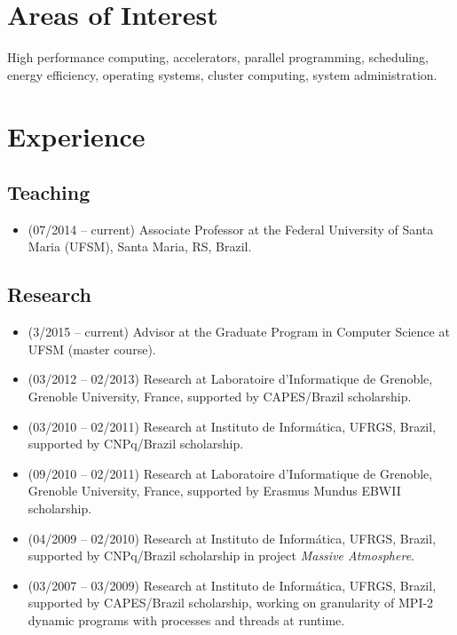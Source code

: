 \documentclass[11pt,a4paper]{article}
\begin{document}
\section{Areas of Interest} 

High performance computing, accelerators, parallel programming, 
scheduling, energy efficiency, operating systems, cluster computing,
system administration.

\section{Experience}

\subsection{Teaching}

\begin{itemize}  \itemsep -2pt %
\item (07/2014 -- current) Associate Professor at the Federal University
of Santa Maria (UFSM), Santa Maria, RS, Brazil.
\end{itemize}

\subsection{Research}

\begin{itemize}  \itemsep -2pt %
\item (3/2015 -- current) Advisor at the Graduate Program in Computer
Science at UFSM (master course).

\item (03/2012 -- 02/2013) Research at Laboratoire d'Informatique de
Grenoble, Grenoble University, France, supported by CAPES/Brazil scholarship.

\item (03/2010 -- 02/2011) Research at Instituto de Informática, UFRGS, Brazil,
supported by CNPq/Brazil scholarship.

\item (09/2010 -- 02/2011) Research at Laboratoire d'Informatique de Grenoble,
Grenoble University, France, supported by Erasmus Mundus EBWII scholarship.

\item (04/2009 -- 02/2010) Research at Instituto de Informática, UFRGS, Brazil,
supported by CNPq/Brazil scholarship in project {\it Massive Atmosphere}.

\item (03/2007 -- 03/2009) Research at Instituto de Informática, UFRGS, Brazil,
supported by CAPES/Brazil scholarship, working on granularity of MPI-2 dynamic 
programs with processes and threads at runtime.
\end{itemize}
\end{document}
